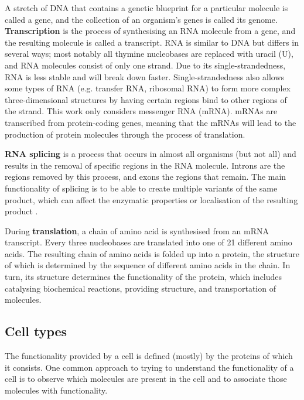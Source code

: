 A stretch of DNA that contains a genetic blueprint for a particular molecule is called a gene, and the collection of an organism's genes is called its genome. \textbf{Transcription} is the process of synthesising an RNA molecule from a gene, and the resulting molecule is called a transcript. RNA is similar to DNA but differs in several ways; most notably all thymine nucleobases are replaced with uracil (U), and RNA molecules consist of only one strand. Due to its single-strandedness, RNA is less stable and will break down faster. Single-strandedness also allows some types of RNA (e.g. transfer RNA, ribosomal RNA) to form more complex three-dimensional structures by having certain regions bind to other regions of the strand. This work only considers messenger RNA (mRNA). mRNAs are transcribed from protein-coding genes, meaning that the mRNAs will lead to the production of protein molecules through the process of translation. 

\textbf{RNA splicing} is a process that occurs in almost all organisms (but not all) and results in the removal of specific regions in the RNA molecule. Introns are the regions removed by this process, and exons the regions that remain. The main functionality of splicing is to be able to create multiple variants of the same product, which can affect the enzymatic properties or localisation of the resulting product \cite{kelemen_functionalternativesplicing_2013}.

During \textbf{translation}, a chain of amino acid is synthesised from an mRNA transcript. Every three nucleobases are translated into one of 21 different amino acids. The resulting chain of amino acids is folded up into a protein, the structure of which is determined by the sequence of different amino acids in the chain. In turn, its structure determines the functionality of the protein, which includes catalysing biochemical reactions, providing structure, and transportation of molecules. 

\subsection{Cell types}
The functionality provided by a cell is defined (mostly) by the proteins of which it consists. One common approach to trying to understand the functionality of a cell is to observe which molecules are present in the cell and to associate those molecules with functionality. 

